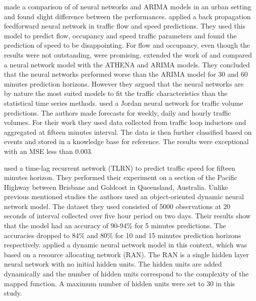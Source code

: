 \citet{clark1993use} made a comparison of of neural networks and ARIMA models in an urban setting
and found slight difference between the performances. \citet{dougherty1997short} applied a
back propagation feedforward neural network in traffic flow and speed predictions. They used this
model to predict flow, occupancy and speed traffic parameters and found the prediction of speed to
be disappointing. For flow and occupancy, even though the results were not outstanding, were promising.
\citet{kirby1997should} extended the work of \citet{clark1993use} and compared a neural network model
with the ATHENA and ARIMA models. They concluded that the neural networks performed worse than the
ARIMA model for 30 and 60 minutes prediction horizons. However they argued that the neural networks
are by nature the most suited models to fit the traffic characteristics than the statistical time
series methods. \citet{yasdi1999prediction} used a Jordan neural network for traffic volume predictions.
The authors made forecasts for weekly, daily and hourly traffic volumes. For their work they used
data collected from traffic loop inductors and aggregated at fifteen minutes interval. The data is
then further classified based on events and stored in a knowledge base for reference. The results were
exceptional with an MSE less than 0.003.

\citet{dia2001object} used a time-lag recurrent network (TLRN) to predict traffic speed for fifteen
minutes horizon. They performed their experiment on a section of the Pacific Highway between
Brisbane and Goldcost in Queensland, Australia. Unlike previous mentioned studies the authors used
an object-oriented dynamic neural network model. The dataset they used consisted of 5000
observations at 20 seconds of interval collected over five hour period on two days. Their results
show that the model had an accuracy of 90-94\% for 5 minutes predictions. The accuracies dropped
to 84\% and 80\% for 10 and 15 minutes prediction horizons respectively. \citet{chen2001use} applied
a dynamic neural network model in this context, which was based on a resource allocating network (RAN).
The RAN is a single hidden layer neural network with no initial hidden units. The hidden units are added
dynamically and the number of hidden units correspond to the complexity of the mapped function. 
A maximum number of hidden units were set to 30 in this study.

